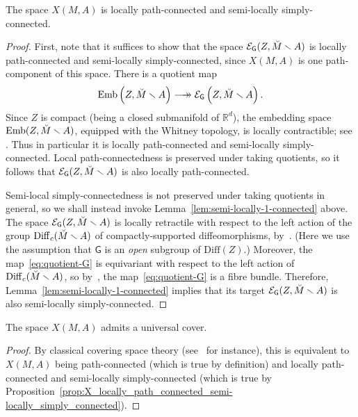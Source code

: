 \documentclass[AHL,Unicode,published]{cedram}
\newcommand{\Emb}{\mathrm{Emb}}
\newcommand{\Diff}{\mathrm{Diff}}
\newcommand{\sG}{\mathsf{G}}
\newcommand{\cE}{\mathcal{E}}
\newcommand{\bR}{\mathbb{R}}
\newcommand{\longtwoheadrightarrow}{\longrightarrow\mathrel{\mkern-14mu}\rightarrow}
\begin{document}
\begin{prop}\label{prop:X_locally_path_connected_semi-locally_simply_connected}
The space $X(M,A)$ is locally path-connected and semi-locally simply-connected.
\end{prop}


\begin{proof}
First, note that it suffices to show that the space $\cE_{\sG}(Z,\Breve{M}\smallsetminus A)$ is locally path-connected and semi-locally simply-connected, since $X(M,A)$ is one path-component of this space. There is a quotient map
\begin{equation}\label{eq:quotient-G}
\Emb\left(Z,\Breve{M}\smallsetminus A\right) \longtwoheadrightarrow \cE_{\sG}\left(Z,\Breve{M}\smallsetminus A\right).
\end{equation}
Since $Z$ is compact (being a closed submanifold of $\bR^d$), the embedding space $\Emb(Z,\Breve{M}\smallsetminus A)$, equipped with the Whitney topology, is locally contractible; see \cite[p.~281, Coro. of Prop.~$4'$]{Cerf1961Topologiedecertains}. Thus in particular it is locally path-connected and semi-locally simply-connected. Local path-connectedness is preserved under taking quotients, so it follows that $\cE_{\sG}(Z,\Breve{M}\smallsetminus A)$ is also locally path-connected.

Semi-local simply-connectedness is not preserved under taking quotients in general, so we shall instead invoke Lemma~\ref{lem:semi-locally-1-connected} above. The space $\cE_{\sG}(Z,\Breve{M}\smallsetminus A)$ is locally retractile with respect to the left action of the group $\Diff_c(\Breve{M}\smallsetminus A)$ of compactly-supported diffeomorphisms, by~\cite[Prop.~4.15]{Palmer2018HomologicalstabilitymoduliI}. (Here we use the assumption that $\sG$ is an \emph{open} subgroup of $\Diff(Z)$.) Moreover, the map~\eqref{eq:quotient-G} is equivariant with respect to the left action of $\Diff_c(\Breve{M}\smallsetminus A)$, so by~\cite[Th.~A]{Palais1960Localtrivialityof}, the map~\eqref{eq:quotient-G} is a fibre bundle. Therefore, Lemma~\ref{lem:semi-locally-1-connected} implies that its target $\cE_{\sG}(Z,\Breve{M}\smallsetminus A)$ is also semi-locally simply-connected.
\end{proof}

\begin{coro}\label{coro:universal-cover}
The space $X(M,A)$ admits a universal cover.
\end{coro}
\begin{proof}
By classical covering space theory (see~\cite[Chap.~1, \S~3]{hatcheralgebraic} for instance), this is equivalent to $X(M,A)$ being path-connected (which is true by definition) and locally path-connected and semi-locally simply-connected (which is true by Proposition~\ref{prop:X_locally_path_connected_semi-locally_simply_connected}).
\end{proof}
\end{document}
